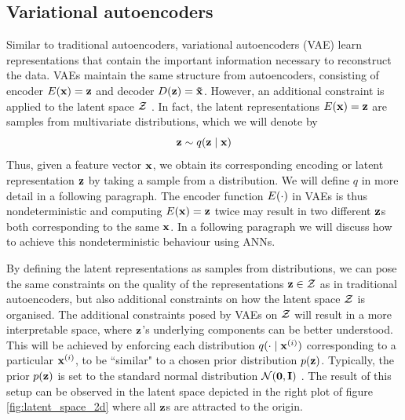 \subsection{Variational autoencoders}

Similar to traditional autoencoders, variational autoencoders (VAE) learn representations that contain the important information necessary to reconstruct the data. VAEs maintain the same structure from autoencoders, consisting of encoder $E(\mathbf{x}) = \mathbf{z}$ and decoder $D(\mathbf{z}) = \mathbf{\tilde{x}}$. However, an additional constraint is applied to the latent space $\mathcal{Z}$ \citep{doerschTutorialVariationalAutoencoders2021, davidfosterVariationalAutoencoders2023, kingmaAutoEncodingVariationalBayes2022, kingmaIntroductionVariationalAutoencoders2019, cinelliVariationalMethodsMachine2021}. In fact, the latent representations $E(\mathbf{x}) = \mathbf{z}$ are samples from multivariate distributions, which we will denote by 
$$\mathbf{z} \sim q (\mathbf{z} \mid \mathbf{x})$$
Thus, given a feature vector $\mathbf{x}$, we obtain its corresponding encoding or latent representation $\mathbf{z}$ by taking a sample from a distribution. We will define $q$ in more detail in a following paragraph. The encoder function $E(\cdot)$ in VAEs is thus nondeterministic and computing $E(\mathbf{x}) = \mathbf{z}$ twice may result in two different $\mathbf{z}$s both corresponding to the same $\mathbf{x}$. In a following paragraph we will discuss how to achieve this nondeterministic behaviour using ANNs.

By defining the latent representations as samples from distributions, we can pose the same constraints on the quality of the representations $\mathbf{z} \in \mathcal{Z}$ as in traditional autoencoders, but also additional constraints on how the latent space $\mathcal{Z}$ is organised. The additional constraints posed by VAEs on $\mathcal{Z}$ will result in a more interpretable space, where $\mathbf{z}$'s underlying components can be better understood. This will be achieved by enforcing each distribution $q ( \cdot \mid \mathbf{x}^{(i)})$ corresponding to a particular $\mathbf{x}^{(i)}$, to be ``similar" to a chosen prior distribution $p(\mathbf{z})$. Typically, the prior $p(\mathbf{z})$ is set to the standard normal distribution $\mathcal{N}(\bm{\mathbf{0}}, \mathbf{I})$ \citep{davidfosterVariationalAutoencoders2023}. The result of this setup can be observed in the latent space depicted in the right plot of figure \ref{fig:latent_space_2d} where all $\mathbf{z}$s are attracted to the origin.

